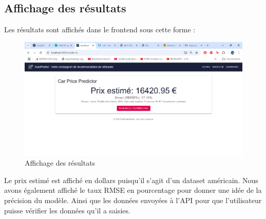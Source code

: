 \documentclass[12pt]{report}
\begin{document}
\subsection{Affichage des résultats}

Les résultats sont affichés dans le frontend sous cette forme : 

\begin{figure}[H]
    \centering
    \includegraphics[width=1\textwidth]{resultats.png}
    \caption{Affichage des résultats}
    \label{fig:resultats}
\end{figure}
Le prix estimé est affiché en dollars puisqu'il s'agit d'un dataset américain. Nous avons également affiché le taux RMSE en pourcentage pour donner une idée de la précision du modèle. Ainsi que les données envoyées à l'API pour que l'utilisateur puisse vérifier les données qu'il a saisies.
\end{document}
